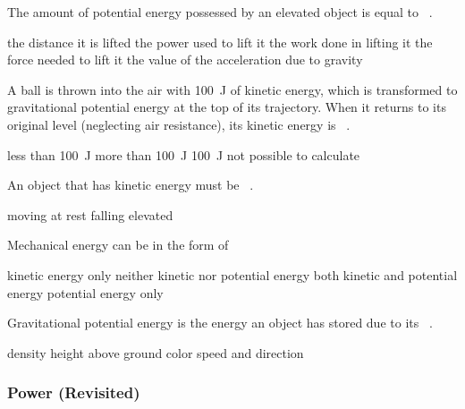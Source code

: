 \documentclass[../main-physics-problems.tex]{subfiles}
\begin{document}
\begin{questions}
\question
The amount of potential energy possessed by an elevated object is equal to \fillin\ .

\begin{randomizechoices}
\choice the distance it is lifted
\choice the power used to lift it
\correctchoice the work done in lifting it
\choice the force needed to lift it
\choice the value of the acceleration due to gravity
\end{randomizechoices}

\question
A  ball is thrown into the air with \SI{100}{J} of kinetic energy, which is transformed to gravitational potential energy at the top of its trajectory. When it returns to its original level (neglecting air resistance), its kinetic energy is \fillin\ .

\begin{randomizechoices}
\choice less than \SI{100}{J}
\choice more than \SI{100}{J}
\correctchoice \SI{100}{J}
\choice not possible to calculate
\end{randomizechoices}

\question
An object that has kinetic energy must be \fillin\ .

\begin{randomizechoices}
\correctchoice moving
\choice at rest
\choice falling
\choice elevated
\end{randomizechoices}


\question
Mechanical energy can be in the form of

\begin{randomizechoices}
\choice kinetic energy only
\choice neither kinetic nor potential energy
\correctchoice both kinetic and potential energy
\choice potential energy only
\end{randomizechoices}

\question
Gravitational potential energy is the energy an object has stored due to its \fillin\ .

\begin{randomizechoices}
\choice density
\correctchoice height above ground
\choice color
\choice speed and direction
\end{randomizechoices}


\end{questions}

\subsubsection{Power (Revisited)}
\end{document}
